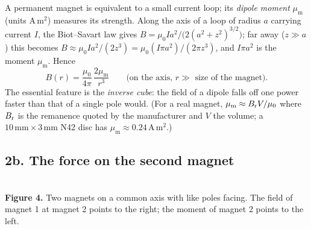 \documentclass[11pt,a4paper]{article}
\newcommand{\muz}{\mu_0}
\newcommand{\mum}{\mu_{\mathrm m}}
\newcommand{\un}[1]{\,\mathrm{#1}}
\begin{document}
A permanent magnet is equivalent to a small current loop; its \emph{dipole moment} $\mum$ (units $\mathrm{A\,m^2}$) measures its strength. Along the axis of a loop of radius $a$ carrying current $I$, the Biot--Savart law gives $B=\muz Ia^2/\big(2(a^2+z^2)^{3/2}\big)$; far away ($z\gg a$) this becomes $B\approx\muz Ia^2/(2z^3)=\muz(I\pi a^2)/(2\pi z^3)$, and $I\pi a^2$ is the moment $\mum$. Hence
\begin{equation}
B(r)=\frac{\muz}{4\pi}\,\frac{2\mum}{r^3}\qquad\text{(on the axis, $r\gg$ size of the magnet).}
\end{equation}
The essential feature is the \emph{inverse cube}: the field of a dipole falls off one power faster than that of a single pole would. (For a real magnet, $\mum\approx B_{\rm r}V/\muz$ where $B_{\rm r}$ is the remanence quoted by the manufacturer and $V$ the volume; a $10\un{mm}\times3\un{mm}$ N42 disc has $\mum\approx0.24\un{A\,m^2}$.)

\subsection*{2b. The force on the second magnet}

\begin{center}
\\[2pt]
{\small\textbf{Figure 4.} Two magnets on a common axis with like poles facing. The field of magnet 1 at magnet 2 points to the right; the moment of magnet 2 points to the left.}
\end{center}
\end{document}
